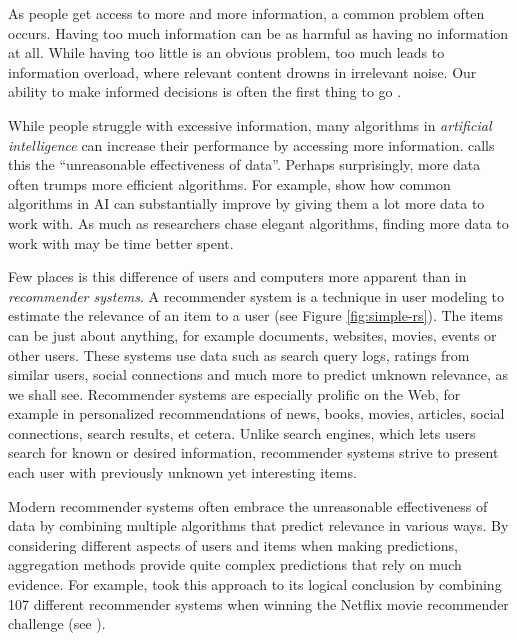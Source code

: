\label{chap:intro}

As people get access to more and more information, a common problem often occurs.
Having too much information can be as harmful as having no information at all.
While having too little is an obvious problem,
too much leads to information overload, where relevant content drowns in irrelevant noise.
Our ability to make informed decisions is often the first thing to go
\cite[p.1]{Davenport2001}.

While people struggle with excessive information,
many algorithms in \emph{artificial intelligence}  
can increase their performance by accessing more information.
\citet{Halevy2009} calls this the ``unreasonable effectiveness of data''.
Perhaps surprisingly, more data often trumps more efficient algorithms.
For example, \citet[p.3]{Banko2001} show how common algorithms in AI 
can substantially improve by giving them a lot more data to work with.
As much as researchers chase elegant algorithms, finding more data to work with may be time better spent.

Few places is this difference of users and computers more apparent than in \emph{recommender systems}.
A recommender system is a technique in user modeling to estimate the relevance of an item to a user
(see Figure \ref{fig:simple-rs}).
The items can be just about anything, for example documents, websites, movies, events or other users.
These systems use data such as search query logs, 
ratings from similar users, social connections and much more
to predict unknown relevance, as we shall see.
Recommender systems are especially prolific on the Web, 
for example in personalized recommendations of news, books, movies,
articles, social connections, search results, et cetera.
Unlike search engines, which lets users search for known or desired information, 
recommender systems strive to present each user with
previously unknown yet interesting items.

Modern recommender systems often embrace the 
unreasonable effectiveness of data
by combining multiple algorithms that predict relevance in various ways.
By considering different aspects of users and items when making predictions,
aggregation methods provide quite complex predictions that rely on much evidence.
For example, \citeauthor{Bell2007} took this approach to its logical conclusion by 
combining 107 different recommender systems when winning the 
Netflix movie recommender challenge
(see \citet{Linden2009}).

